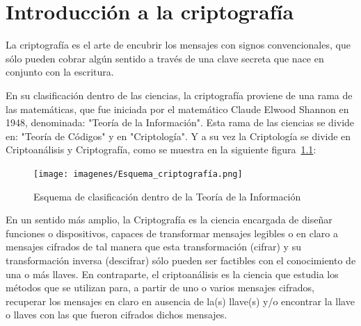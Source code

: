 \chapter{Introducción a la criptografía}
La criptografía es el arte de encubrir los mensajes con signos
convencionales, que sólo pueden cobrar algún sentido a través de una clave
secreta que nace en conjunto con la escritura.

En su clasificación dentro de las ciencias, la criptografía proviene de una rama de las matemáticas, que fue
iniciada por el matemático Claude Elwood Shannon en 1948, denominada: "Teoría de la Información".
Esta rama de las ciencias se divide en: "Teoría de Códigos" y en "Criptología". Y a su vez la Criptología se divide en Criptoanálisis y Criptografía, como se muestra en la siguiente figura~\ref{fig:esquema_criptografia}:
\begin{figure}[H]
    \centering
    \texttt{[image: imagenes/Esquema\_criptografía.png]}
    \caption{Esquema de clasificación dentro de la Teoría de la Información}
    \label{fig:esquema_criptografia}
\end{figure}

En un sentido más amplio, la Criptografía es la ciencia encargada de diseñar funciones o dispositivos, capaces
de transformar mensajes legibles o en claro a mensajes cifrados de tal manera que esta transformación (cifrar) y su transformación inversa (descifrar) sólo pueden ser factibles con el conocimiento de una o más llaves.
En contraparte, el criptoanálisis es la ciencia que estudia los métodos que se utilizan para, a partir de uno o varios mensajes cifrados, recuperar los mensajes en claro en ausencia de la(s) llave(s) y/o encontrar la llave o llaves con las que fueron cifrados dichos mensajes.

